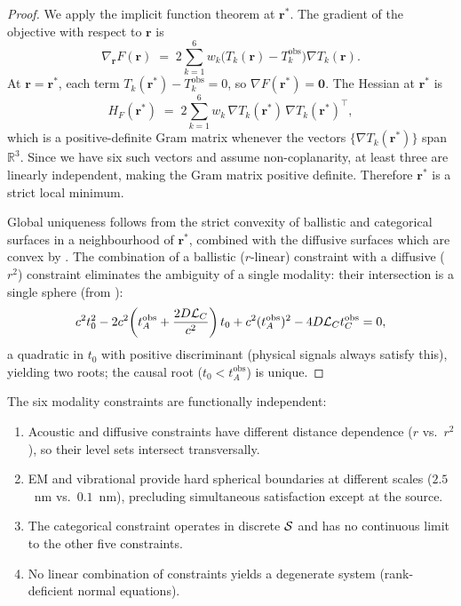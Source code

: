 \begin{proof}
We apply the implicit function theorem at $\mathbf{r}^{*}$.  The gradient of
the objective with respect to $\mathbf{r}$ is
\[
  \nabla_{\mathbf{r}} F(\mathbf{r})
  \;=\; 2\sum_{k=1}^{6} w_k \bigl(T_k(\mathbf{r}) - T_k^{\mathrm{obs}}\bigr)
    \nabla T_k(\mathbf{r}).
\]
At $\mathbf{r} = \mathbf{r}^{*}$, each term $T_k(\mathbf{r}^{*}) -
T_k^{\mathrm{obs}} = 0$, so $\nabla F(\mathbf{r}^{*}) = \mathbf{0}$.  The
Hessian at $\mathbf{r}^{*}$ is
\[
  H_F(\mathbf{r}^{*})
  \;=\; 2\sum_{k=1}^{6} w_k \,\nabla T_k(\mathbf{r}^{*})\,
    \nabla T_k(\mathbf{r}^{*})^{\!\top},
\]
which is a positive-definite Gram matrix whenever the vectors
$\{\nabla T_k(\mathbf{r}^{*})\}$ span $\mathbb{R}^3$.  Since we have six
such vectors and assume non-coplanarity, at least three are linearly
independent, making the Gram matrix positive definite.  Therefore
$\mathbf{r}^{*}$ is a strict local minimum.

Global uniqueness follows from the strict convexity of ballistic and
categorical surfaces in a neighbourhood of $\mathbf{r}^{*}$, combined with
the diffusive surfaces which are convex by .  The
combination of a ballistic ($r$-linear) constraint with a diffusive ($r^2$)
constraint eliminates the ambiguity of a single modality: their intersection
is a single sphere (from ):
\[
    c^2t_0^2 - 2c^2\!\left(t_A^\mathrm{obs}
    + \frac{2D\mathcal{L}_C}{c^2}\right)t_0
    + c^2(t_A^\mathrm{obs})^2 - 4D\mathcal{L}_C t_C^\mathrm{obs} = 0,
\]
a quadratic in $t_0$ with positive discriminant (physical signals always
satisfy this), yielding two roots; the causal root ($t_0 < t_A^\mathrm{obs}$)
is unique.
\end{proof}

\begin{lemma}
\label{lem:constraint-indep}
The six modality constraints are functionally independent:
\begin{enumerate}[label=(\roman*)]
    \item Acoustic and diffusive constraints have different distance dependence
          ($r$ vs.\ $r^2$), so their level sets intersect transversally.
    \item EM and vibrational provide hard spherical boundaries at different
          scales ($2.5$~nm vs.\ $0.1$~nm), precluding simultaneous satisfaction
          except at the source.
    \item The categorical constraint operates in discrete $\mathcal{S}$ and has
          no continuous limit to the other five constraints.
    \item No linear combination of constraints yields a degenerate system
          (rank-deficient normal equations).
\end{enumerate}
\end{lemma}


